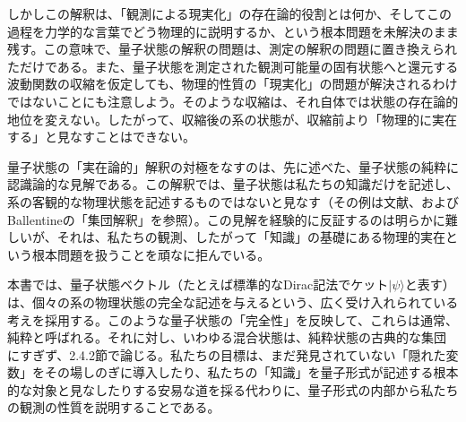 \hypertarget{srcpage:19}{}\label{srcpage:19}
しかしこの解釈は、「観測による現実化」の存在論的役割とは何か、そしてこの過程を力学的な言葉でどう物理的に説明するか、という根本問題を未解決のまま残す。この意味で、量子状態の解釈の問題は、測定の解釈の問題に置き換えられただけである。また、量子状態を測定された観測可能量の固有状態へと還元する波動関数の収縮を仮定しても、物理的性質の「現実化」の問題が解決されるわけではないことにも注意しよう。そのような収縮は、それ自体では状態の存在論的地位を変えない。したがって、収縮後の系の状態が、収縮前より「物理的に実在する」と見なすことはできない。

量子状態の「実在論的」解釈の対極をなすのは、先に述べた、量子状態の純粋に認識論的な見解である。この解釈では、量子状態は私たちの知識だけを記述し、系の客観的な物理状態を記述するものではないと見なす（その例は文献\cite{ref044}、およびBallentineの「集団解釈」\cite{ref045,ref046}を参照）。この見解を経験的に反証するのは明らかに難しいが、それは、私たちの観測、したがって「知識」の基礎にある物理的実在という根本問題を扱うことを頑なに拒んでいる。

本書では、量子状態ベクトル（たとえば標準的なDirac記法でケット$\lvert\psi\rangle$と表す）は、個々の系の物理状態の完全な記述を与えるという、広く受け入れられている考えを採用する。このような量子状態の「完全性」を反映して、これらは通常、純粋と呼ばれる。それに対し、いわゆる混合状態は、純粋状態の古典的な集団にすぎず、2.4.2節で論じる。私たちの目標は、まだ発見されていない「隠れた変数」をその場しのぎに導入したり、私たちの「知識」を量子形式が記述する根本的な対象と見なしたりする安易な道を採る代わりに、量子形式の内部から私たちの観測の性質を説明することである。
